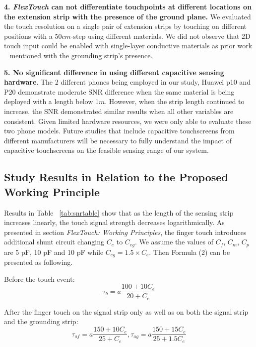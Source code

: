 \textbf{4. \textbf{\textit{FlexTouch}} can not differentiate touchpoints at different locations on the extension strip with the presence of the ground plane.} We evaluated the touch resolution on a single pair of extension strips by touching on different positions with a $50 cm$-step using different materials. We did not observe that 2D touch input could be enabled with single-layer conductive materials as prior work ~\cite{Ikematsu-Ohmic-Touch, mobicom-gao18} mentioned with the grounding strip's presence.

\textbf{5. No significant difference in using different capacitive sensing hardware}. The 2 different phones being employed in our study, Huawei p10 and P20 demonstrate moderate SNR difference when the same material is being deployed with a length below $1m$. However, when the strip length continued to increase, the SNR demonstrated similar results when all other variables are consistent. Given limited hardware resources, we were only able to evaluate these two phone models. Future studies that include capacitive touchscreens from different manufacturers will be necessary to fully understand the impact of capacitive touchscreens on the feasible sensing range of our system.

\subsection{Study Results in Relation to the Proposed Working Principle}
 
Results in Table ~\ref{tab:snrtable} show that as the length of the sensing strip increases linearly, the touch signal strength decreases logarithmically. As presented in section \textit{FlexTouch: Working Principles}, the finger touch introduces additional shunt circuit changing $C_{e}$ to $C_{eg}$. We assume the values of $C_{f}$, $C_{m}$, $C_{p}$ are 5 pF, 10 pF and 10 pF while $C_{eg} = 1.5 \times C_{e}$. Then Formula (2) can be presented as following.

Before the touch event:
\begin{equation}
    \tau_{b} = a\frac{100 + 10C_{e}}{20+C_{e}}
\end{equation}

After the finger touch on the signal strip only as well as on both the signal strip and the grounding strip: 
\begin{equation}
    \tau_{af} = a\frac{150 + 10C_{e}}{25+C_{e}}, \tau_{ag} = a\frac{150 + 15C_{e}}{25+1.5C_{e}}
\end{equation}

